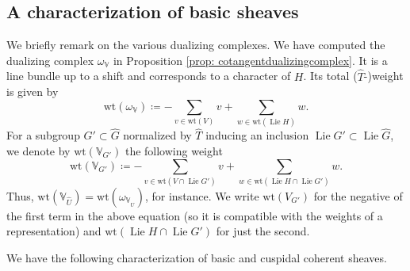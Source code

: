 \documentclass{amsart}
\theoremstyle{definition}
\theoremstyle{remark}
\numberwithin{equation}{section}
\DeclareMathOperator{\Lie}{Lie}
\newcommand{\wh}{\widehat}
\newcommand{\V}{\mathbb{V}}
\newcommand{\wt}{\mathrm{wt}}
\begin{document}
\subsection{A characterization of basic sheaves}
We briefly remark on the various dualizing complexes. We have computed the dualizing complex $\omega_{\V}$ in Proposition \ref{prop: cotangentdualizingcomplex}. It is a line bundle up to a shift and corresponds to a character of $H$. Its total ($\wh T$-)weight is given by
\begin{equation*}
   \wt(\omega_{\V}) \coloneq  -\sum\limits_{v \in \wt(V)} v + \sum\limits_{w \in \wt(\Lie H)} w.
\end{equation*}
For a subgroup $G' \subset \wh{G}$ normalized by $\wh T$ inducing an inclusion $\Lie G' \subset \Lie \wh{G}$, we denote by $\wt(\V_{G'})$ the following weight 
\begin{equation*}
    \wt(\V_{G'}) \coloneq    -\sum\limits_{v \in \wt(V \cap \Lie G')} v + \sum\limits_{w \in \wt(\Lie H \cap \Lie G')} w.
\end{equation*}
Thus, $\wt(\V_{\wh{U}}) = \wt(\omega_{\V_{\wh{U}}})$, for instance. We write $\wt(V_{G'})$ for the negative of the first term in the above equation (so it is compatible with the weights of a representation) and $\wt(\Lie H \cap \Lie G')$ for just the second.

We have the following characterization of basic and cuspidal coherent sheaves.
\end{document}

